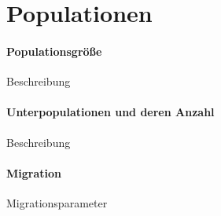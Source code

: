 \section{Populationen}\label{populations}


\paragraph{Populationsgröße}
Beschreibung



\paragraph{Unterpopulationen und deren Anzahl}
Beschreibung



\paragraph{Migration}
Migrationsparameter







